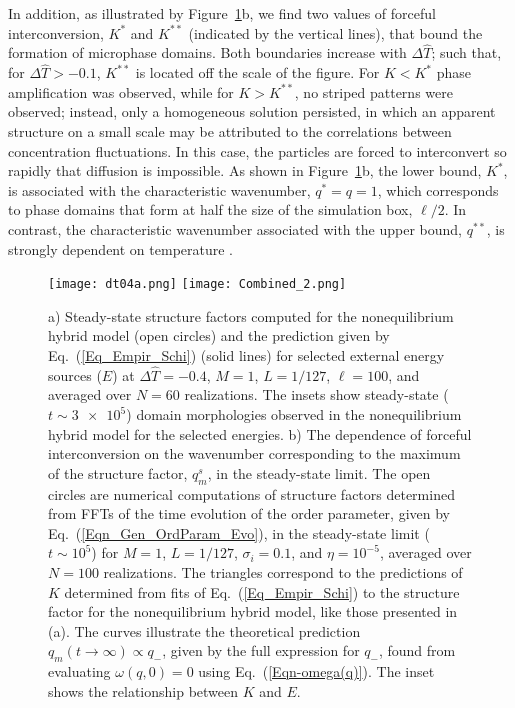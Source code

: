 \documentclass[5p,twocolumn]{elsarticle}
\begin{document}
In addition, as illustrated by Figure~\ref{Fig_Hybrid_Comp}b, we find two values of forceful interconversion, $K^*$ and $K^{**}$ (indicated by the vertical lines), that bound the formation of microphase domains. Both boundaries increase with $\Delta\hat{T}$; such that, for $\Delta \hat{T}>-0.1$, $K^{**}$ is located off the scale of the figure. For $K<K^*$ phase amplification was observed, while for $K>K^{**}$, no striped patterns were observed; instead, only a homogeneous solution persisted, in which an apparent structure on a small scale may be attributed to the correlations between concentration fluctuations. In this case, the particles are forced to interconvert so rapidly that diffusion is impossible. As shown in Figure~\ref{Fig_Hybrid_Comp}b, the lower bound, $K^*$, is associated with the characteristic wavenumber, $q^*=q=1$, which corresponds to phase domains that form at half the size of the simulation box, $\ell/2$. In contrast, the characteristic wavenumber associated with the upper bound, $q^{**}$, is strongly dependent on temperature \cite{Uralcan_Interconversion_2020,MFT_PT_2021}. 


\begin{figure}[h!]
    \centering
    \texttt{[image: dt04a.png]}
    \texttt{[image: Combined\_2.png]}
    \caption{ a) Steady-state structure factors computed for the nonequilibrium hybrid model (open circles) and the prediction given by Eq.~(\ref{Eq_Empir_Schi}) (solid lines) for selected external energy sources ($E$) at $\Delta \hat{T} = -0.4$, $M=1$, $L=1/127$, $\ell = 100$, and averaged over $N=60$ realizations. The insets show steady-state ($t\sim \num{3e5}$) domain morphologies observed in the nonequilibrium hybrid model for the selected energies. b) The dependence of forceful interconversion on the wavenumber corresponding to the maximum of the structure factor, $q_m^s$, in the steady-state limit. The open circles are numerical computations of structure factors determined from FFTs of the time evolution of the order parameter, given by  Eq.~(\ref{Eqn_Gen_OrdParam_Evo}), in the steady-state limit ($t\sim 10^5$) for $M=1$, $L=1/127$, $\sigma_i =0.1$, and $\eta=10^{-5}$, averaged over $N=100$ realizations. The triangles correspond to the predictions of $K$ determined from fits of Eq.~(\ref{Eq_Empir_Schi}) to the structure factor for the nonequilibrium hybrid model, like those presented in (a). The curves illustrate the theoretical prediction $q_m(t\to\infty)\propto q_-$, given by the full expression for $q_-$, found from evaluating $\omega(q,0)=0$ using Eq.~(\ref{Eqn-omega(q)}). The inset shows the relationship between $K$ and $E$.}
    \label{Fig_Hybrid_Comp}
\end{figure}
\end{document}
